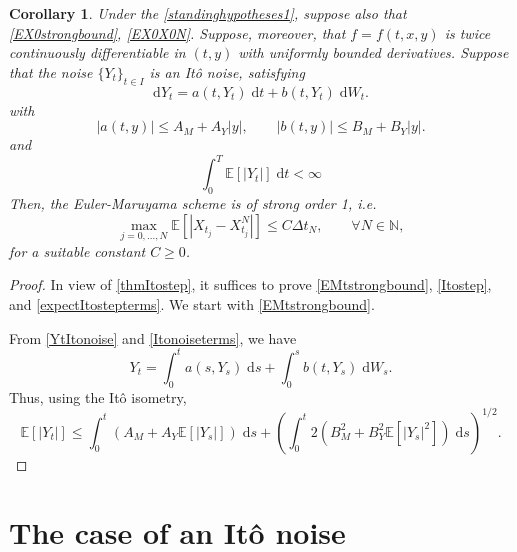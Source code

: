 \documentclass[reqno,12pt]{amsart}
\theoremstyle{plain}%
\newtheorem{cor}{Corollary}[section]
\theoremstyle{definition}
\begin{document}
\begin{cor}
    \label{corItonoise}
    Under the \cref{standinghypotheses1}, suppose also that
    \eqref{EX0strongbound}, \eqref{EX0X0N}. Suppose, moreover, that $f=f(t, x, y)$ is twice continuously differentiable in $(t, y)$ with uniformly bounded derivatives. Suppose that the noise $\{Y_t\}_{t\in I}$ is an It\^o noise, satisfying
    \begin{equation}
        \label{YtItonoise}
        \mathrm{d}Y_t = a(t, Y_t)\;\mathrm{d}t + b(t, Y_t)\;\mathrm{d}W_t.
    \end{equation}
    with
    \begin{equation}
        \label{Itonoiseterms}
        |a(t, y)| \leq A_M + A_Y |y|, \qquad |b(t, y)| \leq B_M + B_Y|y|.
    \end{equation}
    and
    \begin{equation}
        \label{YtItonoiseconditions}
        \int_0^T \mathbb{E}[|Y_t|] \;\mathrm{d}t < \infty
    \end{equation}
    Then, the Euler-Maruyama scheme is of strong order 1, i.e.
    \begin{equation}
        \max_{j=0, \ldots, N}\mathbb{E}\left[ \left| X_{t_j} - X_{t_j}^N \right| \right] \leq C \Delta t_N, \qquad \forall N \in \mathbb{N},
    \end{equation}
  for a suitable constant $C \geq 0$.
\end{cor}

\begin{proof}
    In view of \cref{thmItostep}, it suffices to prove \eqref{EMtstrongbound}, \eqref{Itostep}, and \eqref{expectItostepterms}. We start with \eqref{EMtstrongbound}.

    From \eqref{YtItonoise} and \eqref{Itonoiseterms}, we have
    \[
        Y_t = \int_0^t a(s, Y_s)\;\mathrm{d}s + \int_0^s b(t, Y_s)\;\mathrm{d}W_s.
    \]
    Thus, using the It\^o isometry,
    \[
        \mathbb{E}[|Y_t|] \leq \int_0^t (A_M + A_Y \mathbb{E}[|Y_s|])\;\mathrm{d}s + \left( \int_0^t 2(B_M^2 + B_Y^2 \mathbb{E}[|Y_s|^2])\;\mathrm{d}s\right)^{1/2}.
    \]
\end{proof}

\section{The case of an It\^o noise}
\end{document}
